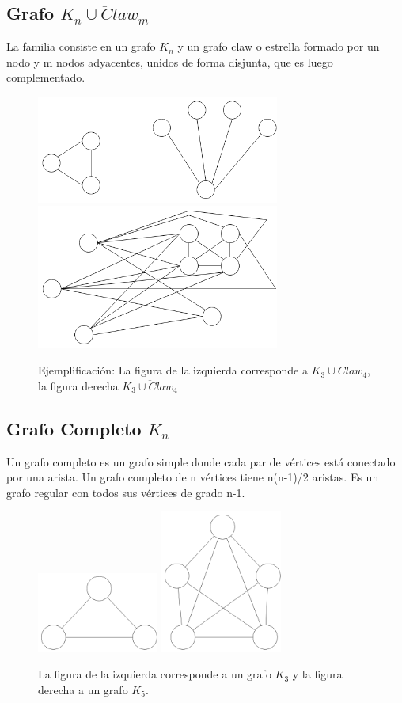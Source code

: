 \subsection{Grafo $\overline{K_n \cup Claw_m}$}
La familia consiste en un grafo $K_n$ y un grafo claw o estrella formado por un nodo y m nodos adyacentes, 
unidos de forma disjunta, que es luego complementado.
\begin{figure}[H]
\includegraphics[width=80mm]{K3UC4.png}
\includegraphics[width=80mm]{K3UC4Complemento.png}
\caption{Ejemplificación: La figura de la izquierda corresponde a $K_3 \cup Claw_4$, 
la figura derecha $\overline{K_3 \cup Claw_4}$}
\label{overflow}
\end{figure}

\subsection{Grafo Completo $K_n$}
Un grafo completo es un grafo simple donde cada par de vértices está conectado por una arista.
Un grafo completo de n vértices tiene n(n-1)/2 aristas.
Es un grafo regular con todos sus vértices de grado n-1.

\begin{figure}[H]
\centering
\includegraphics[width=40mm]{K3.png}
\includegraphics[width=40mm]{K5.png}
\caption{La figura de la izquierda corresponde a un grafo $K_3$ y la figura derecha a un grafo $K_5$.}
\label{overflow}
\end{figure}

